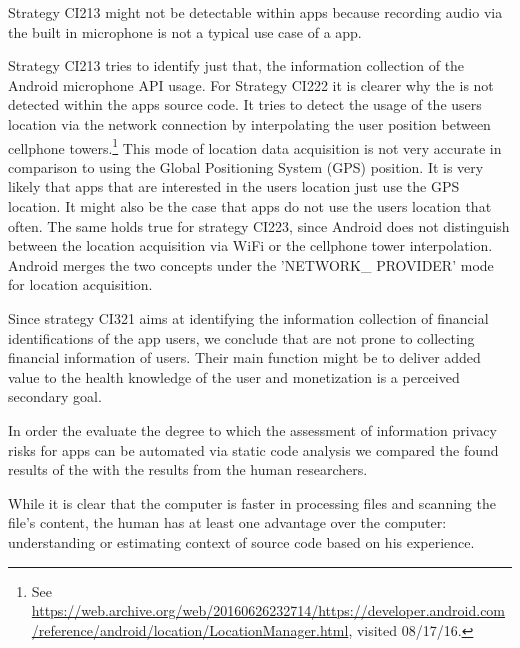 Strategy CI213 might not be detectable within \mH apps because recording audio via the built in microphone is not a typical use case of a \mH app.

Strategy CI213 tries to identify just that, the information collection of the Android microphone API usage.
For Strategy CI222 it is clearer why the \ipr is not detected within the apps source code.
It tries to detect the usage of the users location via the network connection by interpolating the user position between cellphone towers.\footnote{\raggedright See \url{https://web.archive.org/web/20160626232714/https://developer.android.com/reference/android/location/LocationManager.html}, visited 08/17/16.}
This mode of location data acquisition is not very accurate in comparison to using the Global Positioning System (GPS) position.
It is very likely that apps that are interested in the users location just use the GPS location. 
It might also be the case that \mH apps do not use the users location that often.
The same holds true for strategy CI223, since Android does not distinguish between the location acquisition via WiFi or the cellphone tower interpolation.
Android merges the two concepts under the 'NETWORK\_ PROVIDER' mode for location acquisition.

Since strategy CI321 aims at identifying the information collection of financial identifications of the app users, we conclude that \mH are not prone to collecting financial information of users.
Their main function might be to deliver added value to the health knowledge of the user and monetization is a perceived secondary goal.

\newpage
In order the evaluate the degree to which the assessment of information privacy risks for \mH apps can be automated via static code analysis we compared the \ipr found results of the \aiprat with the results from the human researchers.

While it is clear that the computer is faster in processing files and scanning the file's content, the human has at least one advantage over the computer: understanding or estimating context of source code based on his experience.

